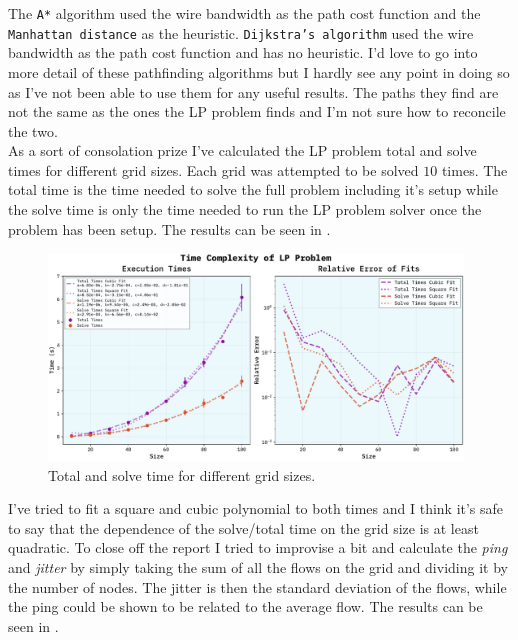 \documentclass[10pt, titlepage, a4paper]{article}
\begin{document}
The \texttt{A*} algorithm used the wire bandwidth as the path cost function and the \texttt{Manhattan distance} as the heuristic. 
\texttt{Dijkstra's algorithm} used the wire bandwidth as the path cost function and has no heuristic. I'd love to go into more detail of 
these pathfinding algorithms but I hardly see any point in doing so as I've not been able to use them for any useful results. The paths 
they find are not the same as the ones the LP problem finds and I'm not sure how to reconcile the two. \\

As a sort of consolation prize I've calculated the LP problem total and solve times for different grid sizes. Each grid was attempted to be 
solved $10$ times. The total time is the time needed to solve the full problem including it's setup while the solve time is only the time needed to 
run the LP problem solver once the problem has been setup. The results can be seen in \textcolor{red}{}.

\begin{figure}[H]
    \centering
    \includegraphics[width=0.98\textwidth]{../Images/time-complexity.pdf}
    \caption{Total and solve time for different grid sizes.}
    \label{fig:time}
\end{figure}

I've tried to fit a square and cubic polynomial to both times and I think it's safe to say that the dependence of the 
solve/total time on the grid size is at least quadratic. To close off the report I tried to improvise a bit and calculate the 
\textit{ping} and \textit{jitter} by simply taking the sum of all the flows on the grid and dividing it by the number of
nodes. The jitter is then the standard deviation of the flows, while the ping could be shown to be related to the average flow.
The results can be seen in \textcolor{red}{}.
\end{document}
